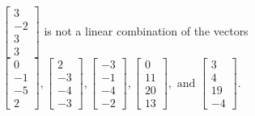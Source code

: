 \begin{exercise}
\begin{exerciseStatement}
  \end{exerciseStatement}
  \begin{exerciseAnswer}
   \(\left[\begin{array}{c}
3 \\
-2 \\
3 \\
3
\end{array}\right]\) 
  	 is not  
	a linear combination of the vectors \(\left[\begin{array}{c}
0 \\
-1 \\
-5 \\
2
\end{array}\right] , \left[\begin{array}{c}
2 \\
-3 \\
-4 \\
-3
\end{array}\right] , \left[\begin{array}{c}
-3 \\
-1 \\
-4 \\
-2
\end{array}\right] , \left[\begin{array}{c}
0 \\
11 \\
20 \\
13
\end{array}\right] , \text{ and } \left[\begin{array}{c}
3 \\
4 \\
19 \\
-4
\end{array}\right]\).

	
  


  \end{exerciseAnswer}
\end{exercise}
